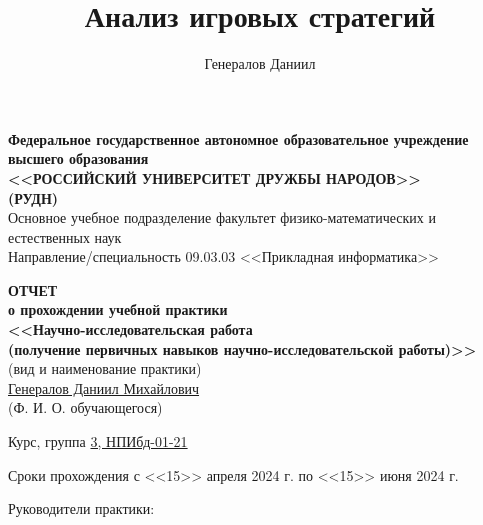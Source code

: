 \documentclass{article}
\title{Анализ игровых стратегий}
\author{Генералов Даниил}
\newcommand{\emptydate}{<<\underline{\phantom{99}}>> \underline{\phantom{февралиюня}} \the\year{} г.}
\begin{document}
\begin{titlepage}
    \setlength{\parindent}{0cm}
    
    \begin{center}
    \hfill \break 
    \textbf{
    \normalsize{Федеральное государственное автономное образовательное учреждение высшего образования}\\
    \large{<<РОССИЙСКИЙ УНИВЕРСИТЕТ ДРУЖБЫ НАРОДОВ>>\\
    (РУДН)}
    }\\
    \normalsize{Основное учебное подразделение факультет физико-математических и естественных наук}\\ 
    \normalsize{Направление/специальность 09.03.03 <<Прикладная информатика>>}\\
    
    \vspace*{\fill}
    
    
    
    
    
    
    
    \Large{\textbf{ОТЧЕТ\\ о прохождении учебной практики\\ <<Научно-исследовательская работа\\ (получение первичных навыков научно-исследовательской работы)>>}}
    \\
    \tiny{(вид и наименование практики)}
    \\ \vspace{5mm}
    \normalsize{\underline{Генералов Даниил Михайлович}}
    \\
    \tiny{(Ф. И. О. обучающегося)}
    \vspace*{\fill}
    \end{center}
    
    Курс, группа \underline{3, НПИбд-01-21}

    Сроки прохождения с <<15>> апреля 2024 г. по <<15>> июня 2024 г.

    \begin{adjustwidth}{0.5\textwidth}{0pt}
    Руководители практики:


\end{adjustwidth}
\end{titlepage}
\end{document}
